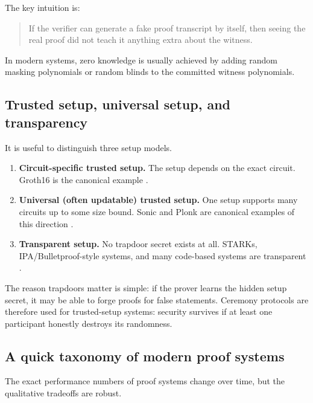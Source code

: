 The key intuition is:
\begin{quote}
If the verifier can generate a fake proof transcript by itself, then seeing the real proof did not teach it anything extra about the witness.
\end{quote}

In modern systems, zero knowledge is usually achieved by adding random masking polynomials or random blinds to the committed witness polynomials.

\subsection{Trusted setup, universal setup, and transparency}

It is useful to distinguish three setup models.

\begin{enumerate}[leftmargin=2em]
    \item \textbf{Circuit-specific trusted setup.} The setup depends on the exact circuit. Groth16 is the canonical example \cite{Groth2016}.
    \item \textbf{Universal (often updatable) trusted setup.} One setup supports many circuits up to some size bound. Sonic and Plonk are canonical examples of this direction \cite{MallerBoweKohlweissMeiklejohn2019,GabizonWilliamsonCiobotaru2019}.
    \item \textbf{Transparent setup.} No trapdoor secret exists at all. STARKs, IPA/Bulletproof-style systems, and many code-based systems are transparent \cite{Bulletproofs2018,BenSassonBentovHoreshRiabzev2018STARK}.
\end{enumerate}

The reason trapdoors matter is simple: if the prover learns the hidden setup secret, it may be able to forge proofs for false statements. Ceremony protocols are therefore used for trusted-setup systems: security survives if at least one participant honestly destroys its randomness.

\subsection{A quick taxonomy of modern proof systems}

The exact performance numbers of proof systems change over time, but the qualitative tradeoffs are robust.

